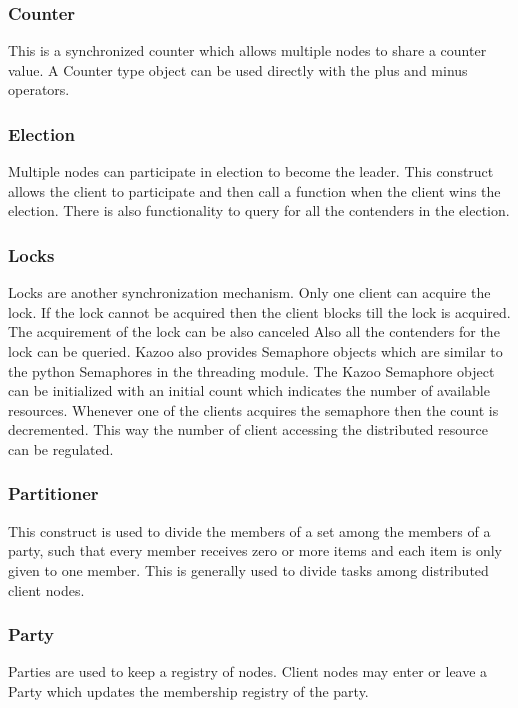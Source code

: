   \subsubsection{Counter}
  This is a synchronized counter which allows multiple nodes to share a counter value. A Counter type object can be used directly with the plus and minus operators.
  \subsubsection{Election}
  Multiple nodes can participate in election to become the leader. This construct allows the client to participate and then call a function when the client wins the election. There is also functionality to query for all the contenders in the election.
  \subsubsection{Locks}
    Locks are another synchronization mechanism. Only one client can acquire the lock. If the lock cannot be acquired then the client blocks till the lock is acquired. The acquirement of the lock can be also canceled Also all the contenders for the lock can be queried. Kazoo also provides Semaphore objects which are similar to the python Semaphores in the threading module. The Kazoo Semaphore object can be initialized with an initial count which indicates the number of available resources. Whenever one of the clients acquires the semaphore then the count is decremented. This way the number of client accessing the distributed resource can be regulated.
  \subsubsection{Partitioner}
  This construct is used to divide the members of a set among the members of a party, such that every member receives zero or more items and each item is only given to one member. This is generally used to divide tasks among distributed client nodes.
  \subsubsection{Party}
    Parties are used to keep a registry of nodes. Client nodes may enter or leave a Party which updates the membership registry of the party.
